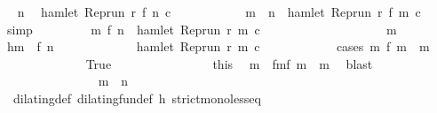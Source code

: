 \begin{isabellebody}
\ \isamarkupfalse%
\ n\ \isamarkupfalse%
\ {\isacartoucheopen}hamlet\ {\isacharparenleft}Rep{\isacharunderscore}run\ r\ {\isacharparenleft}f\ n{\isacharparenright}\ c\isanewline
\ \ \ \ \ \ \isamarkupfalse%
\ {}\ \isamarkupfalse%
\ {}{\isacharcolon}{\isacartoucheopen}{\isasymforall}\ m\ {\isasymge}\ n{\isachardot}\ {\isasymnot}\ hamlet\ {\isacharparenleft}Rep{\isacharunderscore}run\ r\ {\isacharparenleft}f\ m{\isacharparenright}\ c\ \isamarkupfalse%
\ simp\isanewline
\ \ \ \ \ \ \isamarkupfalse%
\ {\isacartoucheopen}{\isasymforall}\ m{\isasymge}\ {\isacharparenleft}f\ n{\isacharparenright}{\isachardot}\ {\isasymnot}\ hamlet\ {\isacharparenleft}Rep{\isacharunderscore}run\ r\ m\ c\isanewline
\ \ \ \ \ \ \isamarkupfalse%
\ {\isacharminus}\isanewline
\ \ \ \ \ \ \ \ \isacommand{{\isacharbraceleft}}\isamarkupfalse%
\ \isamarkupfalse%
\ m\ \isamarkupfalse%
\ h{\isacharcolon}{\isacartoucheopen}m\ {\isasymge}\ f\ n{\isacartoucheclose}\isanewline
\ \ \ \ \ \ \ \ \ \ \isamarkupfalse%
\ {\isacartoucheopen}{\isasymnot}\ hamlet\ {\isacharparenleft}Rep{\isacharunderscore}run\ r\ m\ c\isanewline
\ \ \ \ \ \ \ \ \ \ \isamarkupfalse%
\ {\isacharparenleft}cases\ {\isacartoucheopen}{\isasymexists}m\ f\ m\ {\isacharequal}\ m{\isacartoucheclose}{\isacharparenright}\isanewline
\ \ \ \ \ \ \ \ \ \ \ \ \isamarkupfalse%
\ True\isanewline
\ \ \ \ \ \ \ \ \ \ \ \ \ \ \isamarkupfalse%
\ this\ \isamarkupfalse%
\ m\ \ fm{}{\isacharcolon}{\isacartoucheopen}f\ m\ {\isacharequal}\ m{\isacartoucheclose}\ \isamarkupfalse%
\ blast\isanewline
\ \ \ \ \ \ \ \ \ \ \ \ \ \ \isamarkupfalse%
\ {\isacartoucheopen}m\ {\isasymge}\ n{\isacartoucheclose}\isanewline
\ \ \ \ \ \ \ \ \ \ \ \ \ \ \ \ \isamarkupfalse%
\ {\isachardoublequoteopen}{\isacharasterisk}{\isachardoublequoteclose}\ dilating{\isacharunderscore}def\ dilating{\isacharunderscore}fun{\isacharunderscore}def\ h\ strict{\isacharunderscore}mono{\isacharunderscore}less{\isacharunderscore}eq\ \isamarkupfalse%

\end{isabellebody}
